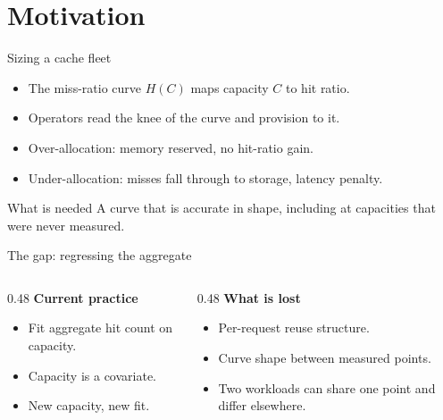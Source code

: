 \section{Motivation}

\begin{frame}{Sizing a cache fleet}
  \begin{itemize}
    \item The miss-ratio curve $H(C)$ maps capacity $C$ to hit ratio.
    \item Operators read the knee of the curve and provision to it.
    \item Over-allocation: memory reserved, no hit-ratio gain.
    \item Under-allocation: misses fall through to storage, latency penalty.
  \end{itemize}
  \vspace{1em}
  \begin{block}{What is needed}
    A curve that is accurate in shape, including at capacities that were never
    measured.
  \end{block}
\end{frame}

\begin{frame}{The gap: regressing the aggregate}
  \begin{columns}[T,onlytextwidth]
    \begin{column}{0.48\textwidth}
      \textbf{Current practice}
      \begin{itemize}
        \item Fit aggregate hit count on capacity.
        \item Capacity is a covariate.
        \item New capacity, new fit.
      \end{itemize}
    \end{column}
    \begin{column}{0.48\textwidth}
      \textbf{What is lost}
      \begin{itemize}
        \item Per-request reuse structure.
        \item Curve shape between measured points.
        \item Two workloads can share one point and differ elsewhere.
      \end{itemize}
    \end{column}
  \end{columns}
\end{frame}
